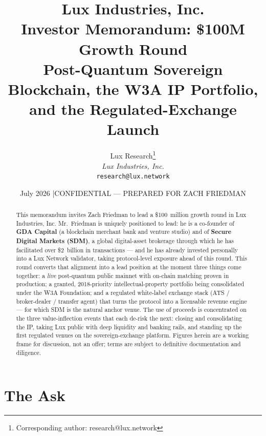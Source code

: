 \documentclass[11pt,a4paper]{article}
\title{Lux Industries, Inc.\\[4pt]
\large Investor Memorandum: \$100M Growth Round\\
Post-Quantum Sovereign Blockchain, the W3A IP Portfolio,\\
and the Regulated-Exchange Launch}
\author{
Lux Research\thanks{Corresponding author: research@lux.network}\\
\textit{Lux Industries, Inc.}\\
\texttt{research@lux.network}
}
\date{July 2026 \quad|\quad CONFIDENTIAL --- PREPARED FOR ZACH FRIEDMAN}
\begin{document}
\luxcoverpage

\begin{abstract}
\noindent This memorandum invites Zach Friedman to lead a \$100~million
growth round in Lux Industries, Inc. Mr.\ Friedman is uniquely positioned to
lead: he is a co-founder of \textbf{GDA Capital} (a blockchain merchant bank
and venture studio) and of \textbf{Secure Digital Markets (SDM)}, a global
digital-asset brokerage through which he has facilitated over \$2~billion in
transactions --- and he has already invested personally into a Lux Network
validator, taking protocol-level exposure ahead of this round. This round
converts that alignment into a lead position at the moment three things come
together: a \emph{live} post-quantum public mainnet with on-chain matching
proven in production; a granted, 2018-priority intellectual-property
portfolio being consolidated under the W3A Foundation; and a regulated
white-label exchange stack (ATS / broker-dealer / transfer agent) that turns
the protocol into a licensable revenue engine --- for which SDM is the
natural anchor venue. The use of proceeds is concentrated on the three
value-inflection events that each de-risk the next: closing and
consolidating the IP, taking Lux public with deep liquidity and banking
rails, and standing up the first regulated venues on the sovereign-exchange
platform. Figures herein are a working frame for discussion, not an offer;
terms are subject to definitive documentation and diligence.
\end{abstract}

\tableofcontents
\newpage

\section{The Ask}
\end{document}
